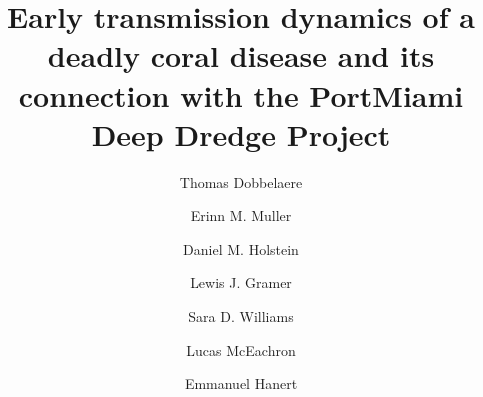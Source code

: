 \documentclass[preprint,12pt,authoryear]{elsarticle}
\begin{document}
\begin{frontmatter}



    \title{Early transmission dynamics of a deadly coral disease and its connection with the PortMiami Deep Dredge Project}%
% 
% 
% 

    \author[eli]{Thomas Dobbelaere}
    \author[mote]{Erinn M. Muller}
    \author[lsu]{Daniel M. Holstein}
    \author[cimas,aoml]{Lewis J. Gramer}
    \author[mote]{Sara D. Williams}
    \author[fwc]{Lucas McEachron}
    \author[eli,immc]{Emmanuel Hanert}


\end{frontmatter}
\end{document}

